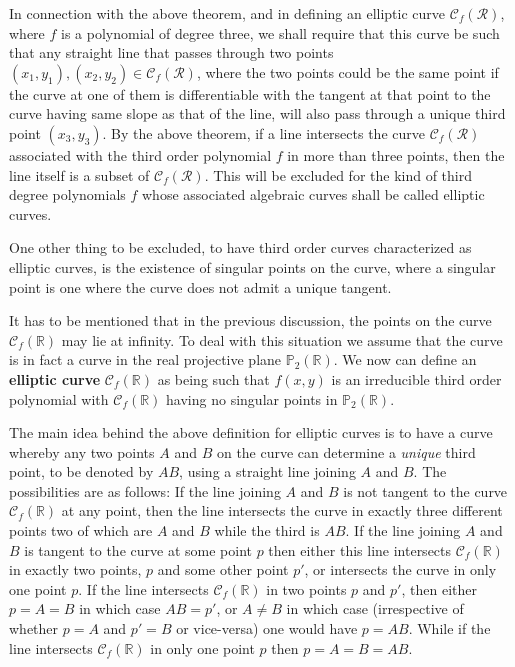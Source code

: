 \documentclass[12pt,letterpaper]{book}
\begin{document}
In connection with the above theorem, and in defining an elliptic curve $\mathscr{C}_f(\mathcal{R})$,
where $f$ is a polynomial of degree three, we shall require that this curve be such that any straight line that
passes through two points $(x_1,y_1), (x_2,y_2)\in\mathscr{C}_f(\mathcal{R})$, where the two points could be the same
point if the curve at one of them is differentiable with the tangent at that point to the curve having same slope as
that of the line, will also pass through a unique third point $(x_3,y_3)$. By the above theorem, if a line intersects
the curve $\mathscr{C}_f(\mathcal{R})$ associated with the third order polynomial $f$ in more than three points, then
the line itself is a subset of $\mathscr{C}_f(\mathcal{R})$. This will be excluded for the kind of third degree
polynomials $f$ whose associated algebraic curves shall be called elliptic curves.

One other thing to be excluded, to have third order curves characterized as elliptic curves, is the existence of
singular points on the curve, where a singular point is one where the curve does not admit a unique tangent.

It has to be mentioned that in the previous discussion, the points
on the curve $\mathscr{C}_f(\mathbb{R})$ may lie at infinity. To
deal with this situation we assume that the curve is in fact a curve
in the real projective plane $\mathbb{P}_2(\mathbb{R})$.
 We now can define an {\bf elliptic curve}
$\mathscr{C}_f(\mathbb{R})$ as being such that $f(x,y)$ is an
irreducible third order polynomial with $\mathscr{C}_f(\mathbb{R})$
having no singular points in $\mathbb{P}_2(\mathbb{R})$.

The main idea behind the above definition for elliptic curves is to have a curve whereby any two points $A$ and $B$
on the curve can determine a {\it unique} third point, to be denoted by $AB$, using a straight line joining $A$ and $B$.
The possibilities are as follows: If the line joining $A$ and $B$ is not tangent to the curve $\mathscr{C}_f(\mathbb{R})$
at any point, then the line intersects the curve in exactly three different points two of which are $A$ and $B$ while the
third is $AB$. If the line joining $A$ and $B$ is tangent to the curve at some point $p$ then either this line intersects
$\mathscr{C}_f(\mathbb{R})$ in exactly two points, $p$ and some other point $p'$, or intersects the curve in only one
point $p$. If the line intersects $\mathscr{C}_f(\mathbb{R})$ in two points $p$ and $p'$, then either $p=A=B$ in which
case $AB=p'$, or $A\neq B$ in which case (irrespective of whether $p=A$ and $p'=B$ or vice-versa) one would have $p=AB$.
While if the line intersects $\mathscr{C}_f(\mathbb{R})$ in only one point $p$ then $p=A=B=AB$.
\end{document}
